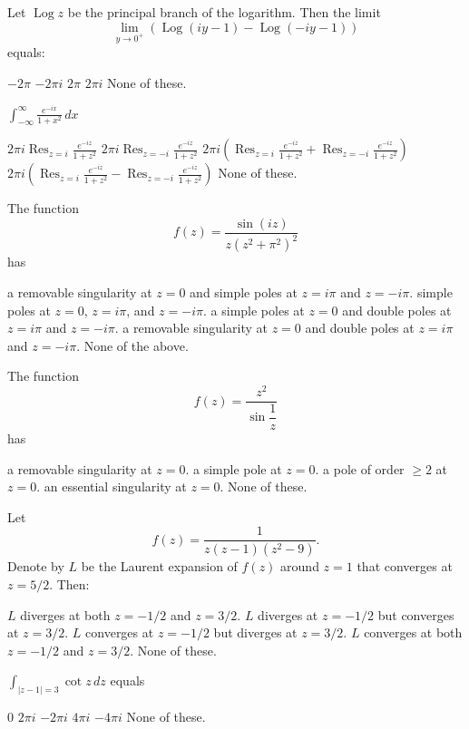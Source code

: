 \documentclass[12pt]{exam}
\DeclareMathOperator{\Log}{Log}
\DeclareMathOperator*{\Res}{Res}
\begin{document}
\begin{questions}
\question
Let $\operatorname{Log}z$ be the principal branch of the logarithm.
Then the limit
\[
    \lim_{y\to 0^+}\left(\Log (iy-1) - \Log(-iy-1)\right)
\]
equals:
\begin{choices}
    \choice $-2\pi$
    \choice $-2\pi i$
    \choice $2\pi$
    \choice $2\pi i$
    \choice None of these.
\end{choices}

\question
$\displaystyle\int_{-\infty}^\infty \frac{e^{-ix}}{1+x^2}\,dx$
\begin{choices}
    \choice $\displaystyle2\pi i\Res_{z=i}\frac{e^{-iz}}{1+z^2}$
    \choice $\displaystyle2\pi i\Res_{z=-i}\frac{e^{-iz}}{1+z^2}$
    \choice $\displaystyle2\pi i\left(\Res_{z=i}\frac{e^{-iz}}{1+z^2} + \Res_{z=-i}\frac{e^{-iz}}{1+z^2}\right)$
    \choice $\displaystyle2\pi i\left(\Res_{z=i}\frac{e^{-iz}}{1+z^2} - \Res_{z=-i}\frac{e^{-iz}}{1+z^2}\right)$
    \choice None of these.
\end{choices}

\question
The function
\[
    f(z) = \frac{\sin(iz)}{z(z^2+\pi^2)^2}
\]
has
\begin{choices}
    \choice a removable singularity at $z=0$ and simple poles at $z=i\pi$ and $z=-i\pi$.
    \choice simple poles at $z=0$, $z=i\pi$, and $z=-i\pi$.
    \choice a simple poles at $z=0$ and double poles at $z=i\pi$ and $z=-i\pi$.
    \choice a removable singularity at $z=0$ and double poles at $z=i\pi$ and $z=-i\pi$.
    \choice None of the above.
\end{choices}

\question
The function
\[
    f(z) = \frac{z^2}{\sin\dfrac1z}
\]
has
\begin{choices}
    \choice a removable singularity at $z=0$.
    \choice a simple pole at $z=0$.
    \choice a pole of order $\geq 2$ at $z=0$.
    \choice an essential singularity at $z=0$.
    \choice None of these.
\end{choices}

\question
Let
\[
    f(z) = \frac1{z(z-1)(z^2-9)}.
\]
Denote by $L$ be the Laurent expansion of $f(z)$ around $z=1$ that converges at $z=5/2$.
Then:
\begin{choices}
    \choice $L$ diverges at both $z=-1/2$ and $z=3/2$.
    \choice $L$ diverges at $z=-1/2$ but converges at $z=3/2$.
    \choice $L$ converges at $z=-1/2$ but diverges at $z=3/2$.
    \choice $L$ converges at both $z=-1/2$ and $z=3/2$.
    \choice None of these.
\end{choices}

\question
$\displaystyle \int_{|z-1|=3}\cot z\,dz$ equals
\begin{choices}
    \choice $0$
    \choice $2\pi i$
    \choice $-2\pi i$
    \choice $4\pi i$
    \choice $-4\pi i$
    \choice None of these.
\end{choices}


\end{questions}
\end{document}
